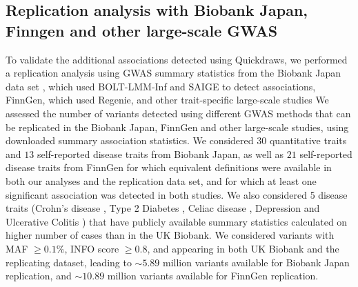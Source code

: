 \clearpage

\subsection{Replication analysis with Biobank Japan, Finngen and other large-scale GWAS}

To validate the additional associations detected using Quickdraws, we performed a replication analysis using GWAS summary statistics from the Biobank Japan data set \cite{nagai2017overview}, which used BOLT-LMM-Inf and SAIGE to detect associations, FinnGen, \cite{kurki2023finngen} which used Regenie, and other trait-specific large-scale studies \cite{jostins2012host, diabetes2012large, dubois2010multiple, nagel2018meta, de2017genome}
%
We assessed the number of variants detected using different GWAS methods that can be replicated in the Biobank Japan, FinnGen and other large-scale studies, using downloaded summary association statistics.
%
We considered $30$ quantitative traits and $13$ self-reported disease traits from Biobank Japan, as well as $21$ self-reported disease traits from FinnGen for which equivalent definitions were available in both our analyses and the replication data set, and for which at least one significant association was detected in both studies.
%
We also considered 5 disease traits (Crohn's disease \cite{jostins2012host}, Type 2 Diabetes \cite{diabetes2012large}, Celiac disease \cite{dubois2010multiple}, Depression \cite{nagel2018meta} and Ulcerative Colitis \cite{de2017genome}) that have publicly available summary statistics calculated on higher number of cases than in the UK Biobank.
%
We considered variants with MAF $\geq 0.1\%$, INFO score $\geq 0.8$, and appearing in both UK Biobank and the replicating dataset, leading to ${\sim}5.89$ million variants available for Biobank Japan replication, and ${\sim}10.89$ million variants available for FinnGen replication.
%

